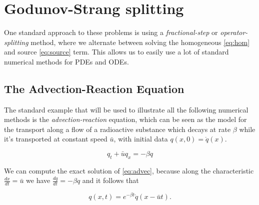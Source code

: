 \documentclass[journal,onecolumn]{IEEEtran}
\begin{document}




\section{Godunov-Strang splitting}

One standard approach to these problems is using a \textit{fractional-step} or \textit{operator-splitting} method, where we alternate between solving the homogeneous \eqref{eq:hom} and source \eqref{eq:source} term. This allows us to easily use a lot of standard numerical methods for PDEs and ODEs.

\subsection{The Advection-Reaction Equation}

The standard example that will be used to illustrate all the following numerical methods is the \textit{advection-reaction} equation, which can be seen as the model for the transport along a flow of a radioactive substance which decays at rate $\beta$ while it's transported at constant speed $\bar{u}$, with initial data $q(x,0)= \mathring{q}(x)$.

\begin{equation}\label{eq:advec}
	q_t + \bar{u}q_x=-\beta q
\end{equation}

We can compute the exact solution of \eqref{eq:advec}, because along the characteristic $\frac{dx}{dt}=\bar{u}$ we have $\frac{dq}{dt}=-\beta q$ and it follows that

\begin{equation}\label{eq:advec_sol}
	q(x,t) = e^{-\beta t}\mathring{q}(x-\bar{u}t).
\end{equation}
\end{document}

